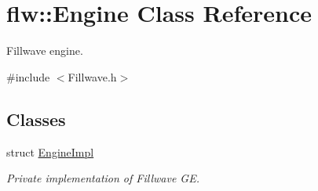 \hypertarget{classflw_1_1Engine}{}\section{flw\+:\+:Engine Class Reference}
\label{classflw_1_1Engine}


Fillwave engine.  




{\ttfamily \#include $<$Fillwave.\+h$>$}

\subsection*{Classes}
\begin{DoxyCompactItemize}
\item 
struct \hyperlink{structflw_1_1Engine_1_1EngineImpl}{Engine\+Impl}
\begin{DoxyCompactList}\small\item\em Private implementation of Fillwave GE. \end{DoxyCompactList}\end{DoxyCompactItemize}

